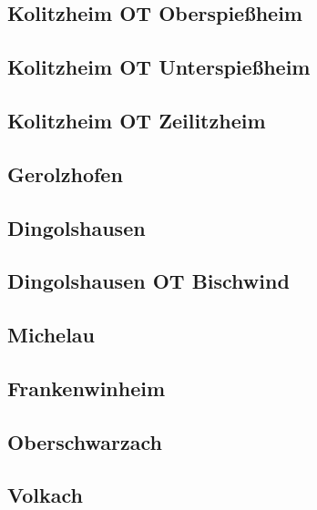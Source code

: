 \documentclass[fontsize=12pt,a4paper]{scrreprt}
\begin{document}
        \subsection{Kolitzheim OT Oberspießheim}
        

        \subsection{Kolitzheim OT Unterspießheim}
        

        \subsection{Kolitzheim OT Zeilitzheim}
        

        \subsection{Gerolzhofen}
        

        \subsection{Dingolshausen}
        

        \subsection{Dingolshausen OT Bischwind}
        

        \subsection{Michelau}
        

        \subsection{Frankenwinheim}
        

        \subsection{Oberschwarzach}
        

        \subsection{Volkach}
        
\end{document}

